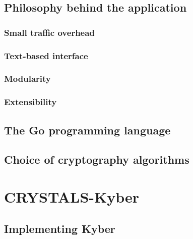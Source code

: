 \section{Philosophy behind the application}
\label{sec:philo_behind_app}


\subsection{Small traffic overhead}
\label{subsec:network_footprint}


\subsection{Text-based interface}
\label{subsec:text_based_interface}


\subsection{Modularity}
\label{subsec:modular_app}


\subsection{Extensibility}
\label{subsec:extensible_app}


\section{The Go programming language}
\label{sec:go_lang}


\section{Choice of cryptography algorithms}
\label{sec:implementations}


\chapter{CRYSTALS-Kyber}
\label{ch:kyber}


\section{Implementing Kyber}
\label{sec:implementing_kyber}


